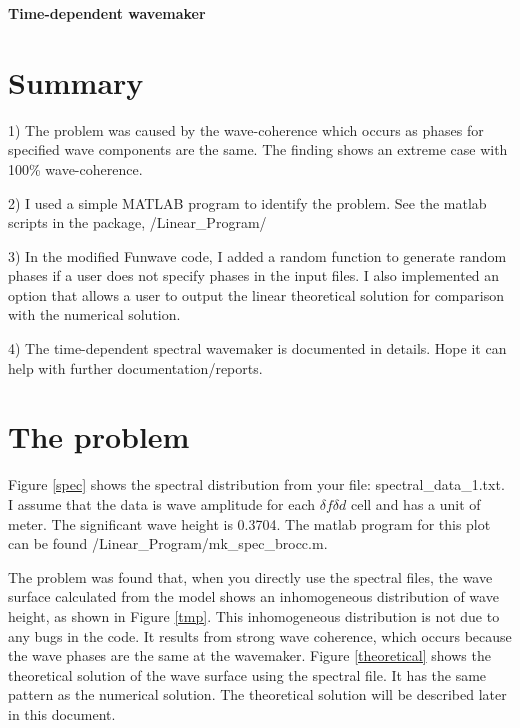 \documentclass[preprint,10pt]{elsarticle}
\begin{document}

\begin{center}
{\bf \Huge Time-dependent wavemaker}
 \end{center}
 
 \section{Summary}
 
 1) The problem was caused by the wave-coherence which occurs as  phases for specified wave components are the same. The finding shows an extreme case with 100\% wave-coherence. 
 
 2) I used a simple MATLAB program to identify the problem. See the matlab scripts in the package, /Linear\_Program/
 
 3) In the modified Funwave code, I added a random function to generate random phases if a user does not specify phases in the input files. I also implemented an option that allows a user to output the linear theoretical solution for comparison with the numerical solution.  
 
 4) The time-dependent spectral wavemaker is documented in details. Hope it can help with further documentation/reports. 
 
 \section{The problem  } 
  
  Figure \ref{spec} shows the spectral distribution from your file: spectral\_data\_1.txt. I assume that the data is wave amplitude for each $\delta f \delta d$ cell and has a unit of meter. The significant wave height is 0.3704.  The matlab program for this plot can be found /Linear\_Program/mk\_spec\_brocc.m. 
  
The problem was found that, when you directly use the spectral files, the wave surface calculated from the model shows an inhomogeneous distribution of wave height, as shown in Figure \ref{tmp}. This inhomogeneous distribution is not due to any bugs in the code. It results from strong wave coherence, which occurs because the wave phases are the same at the wavemaker. Figure \ref{theoretical} shows the theoretical solution of the wave surface using the spectral file. It has the same pattern as the numerical solution. The theoretical solution will be described later in this document.
  
\end{document}

